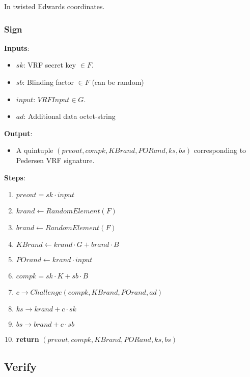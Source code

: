 \documentclass[
]{article}
\providecommand{\tightlist}{%
  \setlength{\itemsep}{0pt}\setlength{\parskip}{0pt}}
\begin{document}
In twisted Edwards coordinates.

\hypertarget{sign-1}{%
\subsubsection{Sign}\label{sign-1}}

\textbf{Inputs}:

\begin{itemize}
\tightlist
\item
  \(sk\): VRF secret key \(\in F\).
\item
  \(sb\): Blinding factor \(\in F\) (can be random)
\item
  \(input\): \(VRFInput \in G\).
\item
  \(ad\): Additional data octet-string
\end{itemize}

\textbf{Output}:

\begin{itemize}
\tightlist
\item
  A quintuple \((preout, compk, KBrand, PORand, ks, bs)\) corresponding
  to Pedersen VRF signature.
\end{itemize}

\textbf{Steps}:

\begin{enumerate}
\def\labelenumi{\arabic{enumi}.}
\tightlist
\item
  \(preout = sk \cdot input\)
\item
  \(krand \leftarrow RandomElement(F)\)
\item
  \(brand \leftarrow RandomElement(F)\)
\item
  \(KBrand \leftarrow krand \cdot G + brand \cdot B\)
\item
  \(POrand \leftarrow krand \cdot input\)
\item
  \(compk = sk \cdot K + sb \cdot B\)
\item
  \(c \rightarrow Challenge(compk, KBrand, POrand, ad)\)
\item
  \(ks \rightarrow krand + c \cdot sk\)
\item
  \(bs \rightarrow brand + c \cdot sb\)
\item
  \textbf{return} \((preout, compk, KBrand, PORand, ks, bs)\)
\end{enumerate}

\hypertarget{verify-1}{%
\subsection{Verify}\label{verify-1}}
\end{document}
